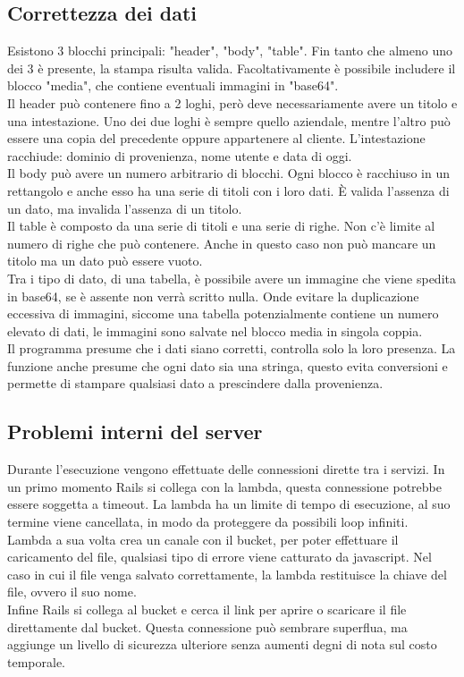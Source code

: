 \documentclass[12pt]{article}
\begin{document}
\subsection{Correttezza dei dati}
Esistono 3 blocchi principali: "header", "body", "table".
Fin tanto che almeno uno dei 3 è presente, la stampa risulta valida.
Facoltativamente è possibile includere il blocco "media", che contiene 
eventuali immagini in "base64". 
\\ Il header può contenere fino a 2 loghi, però deve necessariamente avere 
un titolo e una intestazione. 
Uno dei due loghi è sempre quello aziendale, mentre l'altro può essere una copia 
del precedente oppure appartenere al cliente.
L'intestazione racchiude: dominio di provenienza, nome utente e data di oggi.
\\ Il body può avere un numero arbitrario di blocchi. Ogni blocco è racchiuso 
in un rettangolo e anche esso ha una serie di titoli con i loro dati. 
È valida l'assenza di un dato, ma invalida l'assenza di un titolo. 
\\ Il table è composto da una serie di titoli e una serie di righe. Non c'è limite 
al numero di righe che può contenere.
Anche in questo caso non può mancare un titolo ma un dato può essere vuoto. 
\\ Tra i tipo di dato, di una tabella, 
è possibile avere un immagine che viene spedita in 
base64, se è assente non verrà scritto nulla. Onde evitare la duplicazione 
eccessiva di immagini, siccome una tabella potenzialmente contiene un numero 
elevato di dati, le immagini sono salvate nel blocco media in singola coppia. 
\\ Il programma presume che i dati siano corretti, controlla solo la loro presenza.
La funzione anche presume che ogni dato sia una stringa, questo evita conversioni 
e permette di stampare qualsiasi dato a prescindere dalla provenienza.

\subsection{Problemi interni del server}
Durante l'esecuzione vengono effettuate delle connessioni dirette tra i servizi. 
In un primo momento Rails si collega con la lambda, questa connessione potrebbe 
essere soggetta a timeout. 
La lambda ha un limite di tempo di esecuzione, al suo termine viene cancellata, 
in modo da proteggere da possibili loop infiniti.
\\ Lambda a sua volta crea un canale con il bucket, per poter 
effettuare il caricamento del file, qualsiasi tipo di errore viene catturato da javascript.
Nel caso in cui il file venga salvato correttamente,
la lambda restituisce la chiave del file, ovvero il suo nome. 
\\ Infine Rails si collega al bucket e cerca il link per aprire o scaricare il file 
direttamente dal bucket.
Questa connessione può sembrare superflua, ma aggiunge 
un livello di sicurezza ulteriore senza aumenti degni di nota sul costo temporale. 
\end{document}
